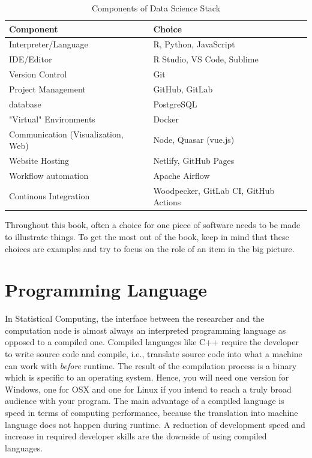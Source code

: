 \documentclass[
  12pt,
  letterpaper,
]{krantz}
\begin{document}
\hypertarget{tbl-stack}{}
\begin{table}
\caption{\label{tbl-stack}Components of Data Science Stack }\tabularnewline

\centering
\begin{tabular}{l>{\raggedright\arraybackslash}p{5.6cm}}
\toprule
Component & Choice\\
\midrule
Interpreter/Language & R, Python, JavaScript\\
IDE/Editor & R Studio, VS Code, Sublime\\
Version Control & Git\\
Project Management & GitHub, GitLab\\
database & PostgreSQL\\
\addlinespace
"Virtual" Environments & Docker\\
Communication (Visualization, Web) & Node, Quasar (vue.js)\\
Website Hosting & Netlify, GitHub Pages\\
Workflow automation & Apache Airflow\\
Continous Integration & Woodpecker, GitLab CI, GitHub Actions\\
\bottomrule
\end{tabular}
\end{table}

Throughout this book, often a choice for one piece of software needs to
be made to illustrate things. To get the most out of the book, keep in
mind that these choices are examples and try to focus on the role of an
item in the big picture.

\hypertarget{programming-language}{%
\section{Programming Language}\label{programming-language}}

In Statistical Computing, the interface between the researcher and the
computation node is almost always an interpreted programming language as
opposed to a compiled one. Compiled languages like C++ require the
developer to write source code and compile, i.e., translate source code
into what a machine can work with \emph{before} runtime. The result of
the compilation process is a binary which is specific to an operating
system. Hence, you will need one version for Windows, one for OSX and
one for Linux if you intend to reach a truly broad audience with your
program. The main advantage of a compiled language is speed in terms of
computing performance, because the translation into machine language
does not happen during runtime. A reduction of development speed and
increase in required developer skills are the downside of using compiled
languages.
\end{document}
